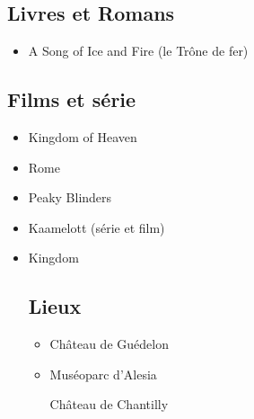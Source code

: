 \documentclass[10pt,a4paper]{book}
\begin{document}
\subsection*{Livres et Romans}
\begin{itemize}
\item A Song of Ice and Fire (le Trône de fer)
\end{itemize}
\subsection*{Films et série}
\begin{itemize}
\item Kingdom of Heaven
\item Rome
\item Peaky Blinders
\item Kaamelott (série et film)
\item Kingdom
\subsection*{Lieux}
\begin{itemize}
\item Château de Guédelon
\item Muséoparc d'Alesia
\item[Château de Chantilly]
\end{itemize}
\end{itemize}
\end{document}
